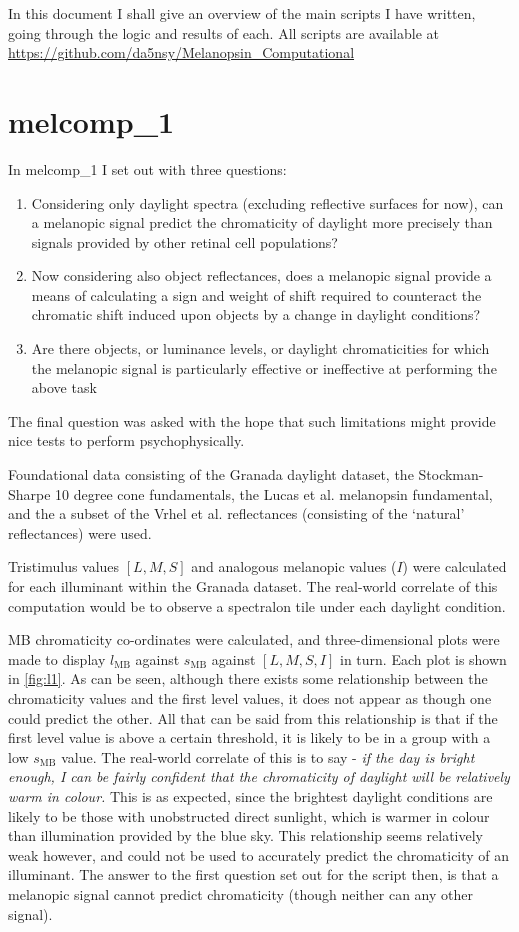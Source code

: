 In this document I shall give an overview of the main scripts I have written, going through the logic and results of each.
All scripts are available at \url{https://github.com/da5nsy/Melanopsin_Computational}

\section{melcomp\_1}

In melcomp\_1 I set out with three questions:
\begin{enumerate}
\item Considering only daylight spectra (excluding reflective surfaces for now), can a melanopic signal predict the chromaticity of daylight more precisely than signals provided by other retinal cell populations?
\item Now considering also object reflectances, does a melanopic signal provide a means of calculating a sign and weight of shift required to counteract the chromatic shift induced upon objects by a change in daylight conditions?
\item Are there objects, or luminance levels, or daylight chromaticities for which the melanopic signal is particularly effective or ineffective at performing the above task
\end{enumerate}

The final question was asked with the hope that such limitations might provide nice tests to perform psychophysically. 

Foundational data consisting of the Granada daylight dataset, the Stockman-Sharpe 10 degree cone fundamentals, the Lucas et al. melanopsin fundamental, and the a subset of the Vrhel et al. reflectances (consisting of the `natural' reflectances) were used.

Tristimulus values $[L,M,S]$ and analogous melanopic values ($I$) were calculated for each illuminant within the Granada dataset. The real-world correlate of this computation would be to observe a spectralon tile under each daylight condition.

\ac{MB} chromaticity co-ordinates were calculated, and three-dimensional plots were made to display $l_{\text{MB}}$ against $s_{\text{MB}}$ against $[L,M,S,I]$ in turn. Each plot is shown in \ref{fig:l1}. As can be seen, although there exists some relationship between the chromaticity values and the first level values, it does not appear as though one could predict the other. All that can be said from this relationship is that if the first level value is above a certain threshold, it is likely to be in a group with a low $s_{\text{MB}}$ value. The real-world correlate of this is to say - \textit{if the day is bright enough, I can be fairly confident that the chromaticity of daylight will be relatively warm in colour.} This is as expected, since the brightest daylight conditions are likely to be those with unobstructed direct sunlight, which is warmer in colour than illumination provided by the blue sky. This relationship seems relatively weak however, and could not be used to accurately predict the chromaticity of an illuminant. The answer to the first question set out for the script then, is that a melanopic signal cannot predict chromaticity (though neither can any other signal).

